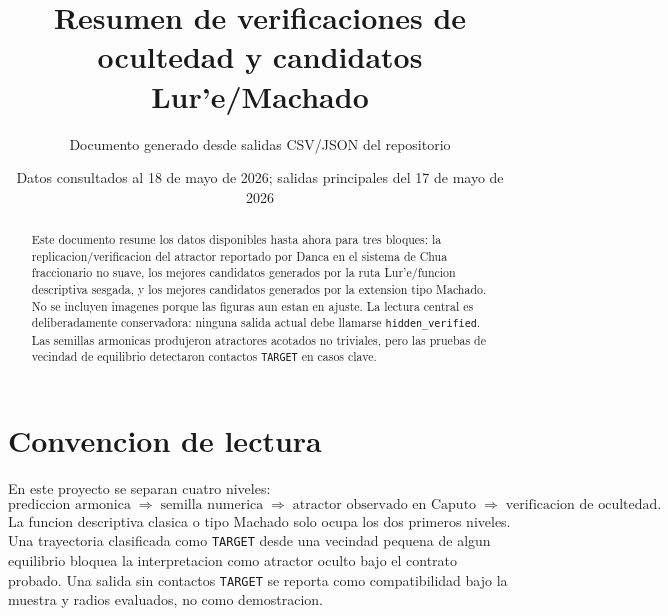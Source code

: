 \documentclass[11pt]{article}
\title{Resumen de verificaciones de ocultedad y candidatos Lur'e/Machado}
\author{Documento generado desde salidas CSV/JSON del repositorio}
\date{Datos consultados al 18 de mayo de 2026; salidas principales del 17 de mayo de 2026}
\newcommand{\target}{\texttt{TARGET}}
\newcommand{\hiddenverified}{\texttt{hidden\_verified}}
\begin{document}
\maketitle

\begin{abstract}
Este documento resume los datos disponibles hasta ahora para tres bloques:
la replicacion/verificacion del atractor reportado por Danca en el sistema de
Chua fraccionario no suave, los mejores candidatos generados por la ruta
Lur'e/funcion descriptiva sesgada, y los mejores candidatos generados por la
extension tipo Machado. No se incluyen imagenes porque las figuras aun estan
en ajuste. La lectura central es deliberadamente conservadora: ninguna salida
actual debe llamarse \hiddenverified. Las semillas armonicas produjeron
atractores acotados no triviales, pero las pruebas de vecindad de equilibrio
detectaron contactos \target{} en casos clave.
\end{abstract}

\section{Convencion de lectura}

En este proyecto se separan cuatro niveles:
\[
\text{prediccion armonica}
\;\Longrightarrow\;
\text{semilla numerica}
\;\Longrightarrow\;
\text{atractor observado en Caputo}
\;\Longrightarrow\;
\text{verificacion de ocultedad}.
\]
La funcion descriptiva clasica o tipo Machado solo ocupa los dos primeros
niveles. Una trayectoria clasificada como \target{} desde una vecindad pequena
de algun equilibrio bloquea la interpretacion como atractor oculto bajo el
contrato probado. Una salida sin contactos \target{} se reporta como
compatibilidad bajo la muestra y radios evaluados, no como demostracion.
\end{document}
